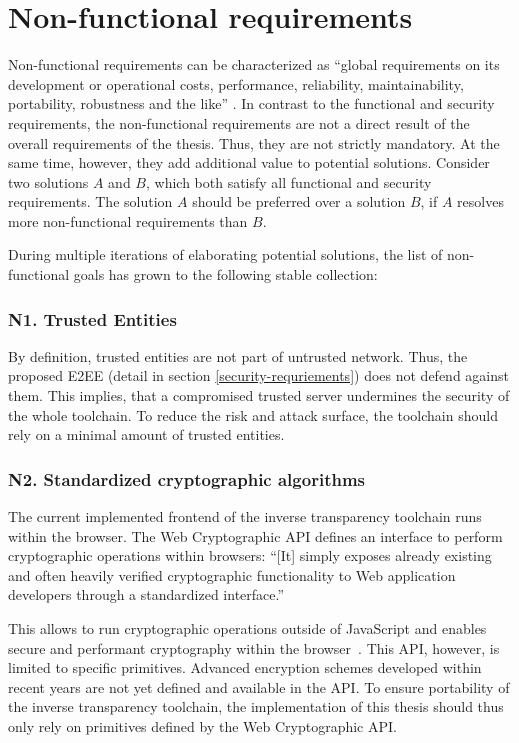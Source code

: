 \documentclass[../main.tex]{subfiles}
\begin{document}
\section{Non-functional requirements}\label{non-functional-requriements}
Non-functional requirements can be characterized as \enquote{global requirements on its development or operational costs, performance, reliability, maintainability, portability, robustness and the like} \cite[11]{Mylopoulos1992}.
In contrast to the functional and security requirements, the non-functional requirements are not a direct result of the overall requirements of the thesis.
Thus, they are not strictly mandatory.
At the same time, however, they add additional value to potential solutions.
Consider two solutions $A$ and $B$, which both satisfy all functional and security requirements.
The solution $A$ should be preferred over a solution $B$, if $A$ resolves more non-functional requirements than $B$.

During multiple iterations of elaborating potential solutions, the list of non-functional goals has grown to the following stable collection:


\subsubsection{N1. Trusted Entities}
By definition, trusted entities are not part of untrusted network. 
Thus, the proposed E2EE (detail in section \ref{security-requriements}) does not defend against them.
This implies, that a compromised trusted server undermines the security of the whole toolchain.
To reduce the risk and attack surface, the toolchain should rely on a minimal amount of trusted entities.

\subsubsection{N2. Standardized cryptographic algorithms}
The current implemented frontend of the inverse transparency toolchain runs within the browser. 
The Web Cryptographic API \cite{WebCryptoApi2017} defines an interface to perform cryptographic operations within browsers:
\enquote{[It] simply exposes already existing and often heavily verified cryptographic functionality to Web application developers through a standardized interface.} ~\cite[959]{Halpin2014}

This allows to run cryptographic operations outside of JavaScript and enables secure and performant cryptography within the browser~\cite{Halpin2014}.
This API, however, is limited to specific primitives. 
Advanced encryption schemes developed within recent years are not yet defined and available in the API.
To ensure portability of the inverse transparency toolchain, the implementation of this thesis should thus only rely on primitives defined by the Web Cryptographic API.
\end{document}

